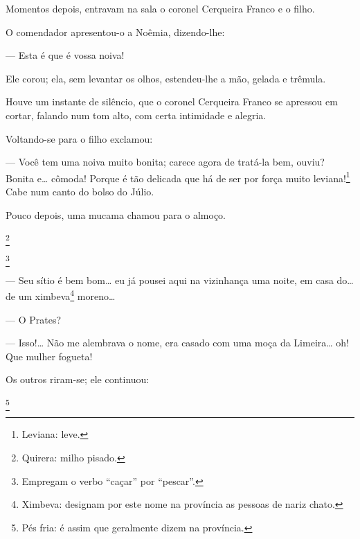 {Momentos depois, entravam na sala o coronel Cerqueira Franco e o
filho.


O comendador apresentou-o a Noêmia, dizendo-lhe:

--- Esta é que é vossa noiva!

Ele corou; ela, sem levantar os olhos, estendeu-lhe a mão,
gelada e trêmula.

Houve um instante de silêncio, que o coronel Cerqueira Franco se
apressou em cortar, falando num tom alto, com certa intimidade e
alegria.

Voltando-se para o filho exclamou:

--- Você tem uma noiva muito bonita; carece agora de
tratá-la bem, ouviu? Bonita e\ldots{} cômoda! Porque é
tão delicada que há de ser por força muito leviana!\footnote{Leviana:
  leve.} Cabe num canto do bolso do Júlio.

Pouco depois, uma mucama chamou para o almoço.

\footnote{Quirera: milho
  pisado.} 

\footnote{Empregam o verbo ``caçar'' por ``pescar''.}

--- Seu sítio é bem bom\ldots{} eu já pousei
aqui na vizinhança uma noite, em casa do\ldots{} de um
ximbeva\footnote{Ximbeva: designam por este nome na
  província as pessoas de nariz chato.} moreno\ldots{}

--- O Prates?

--- Isso!\ldots{} Não me alembrava o nome, era casado com
uma moça da Limeira\ldots{} oh! Que mulher fogueta!

Os outros riram-se; ele continuou:

\footnote{Pés fria: é assim
  que geralmente dizem na província.} 

}
